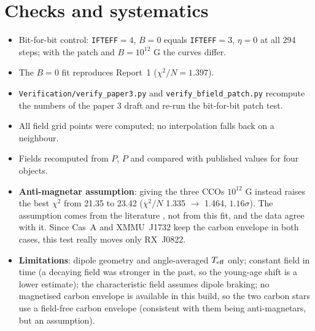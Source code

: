 \documentclass[11pt,a4paper]{article}
\newcommand{\Teff}{T_{\rm eff}}
\begin{document}
\section{Checks and systematics}
\begin{itemize}
\item Bit-for-bit control: \texttt{IFTEFF}$=4$, $B=0$ equals \texttt{IFTEFF}$=3$, $\eta=0$ at all 294 steps; with the patch and $B=10^{12}$ G the curves differ.
\item The $B=0$ fit reproduces Report~1 ($\chi^2/N=1.397$).
\item \texttt{Verification/verify\_paper3.py} and \texttt{verify\_bfield\_patch.py} recompute the numbers of the paper 3 draft and re-run the bit-for-bit patch test.
\item All field grid points were computed; no interpolation falls back on a neighbour.
\item Fields recomputed from $P$, $\dot P$ and compared with published values for four objects.
\item \textbf{Anti-magnetar assumption}: giving the three CCOs $10^{12}$ G instead raises the best $\chi^2$ from 21.35 to 23.42 ($\chi^2/N$ 1.335 $\to$ 1.464, $1.16\sigma$). The assumption comes from the literature \cite{DeLuca2017}, not from this fit, and the data agree with it. Since Cas~A and XMMU~J1732 keep the carbon envelope in both cases, this test really moves only RX~J0822.
\item \textbf{Limitations}: dipole geometry and angle-averaged $\Teff$ only; constant field in time (a decaying field was stronger in the past, so the young-age shift is a lower estimate); the characteristic field assumes dipole braking; no magnetised carbon envelope is available in this build, so the two carbon stars use a field-free carbon envelope (consistent with them being anti-magnetars, but an assumption).
\end{itemize}

\end{document}
